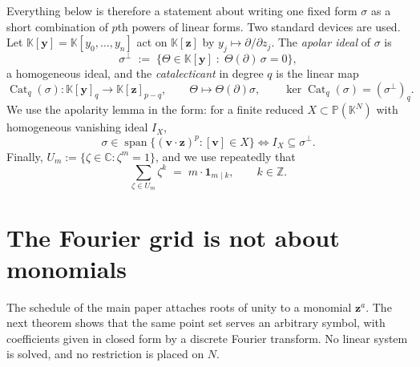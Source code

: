 \documentclass[final]{siamltex}
\DeclareMathOperator{\spanop}{span}
\DeclareMathOperator{\Cat}{Cat}
\newcommand{\C}{\mathbb{C}}
\newcommand{\Z}{\mathbb{Z}}
\newcommand{\K}{\mathbb{K}}
\newcommand{\by}{\bm{y}}
\newcommand{\bz}{\bm{z}}
\newcommand{\bv}{\bm{v}}
\begin{document}
Everything below is therefore a statement about writing one fixed form $\sigma$
as a short combination of $p$th powers of linear forms.  Two standard devices
are used.  Let $\K[\by] = \K[y_{0},\ldots,y_{n}]$ act on $\K[\bz]$ by
$y_{j} \mapsto \partial/\partial z_{j}$.  The \emph{apolar ideal} of $\sigma$ is
\begin{equation}\label{eq_apolar}
  \sigma^{\perp} \;:=\; \{\Theta \in \K[\by] \;:\; \Theta(\partial)\,\sigma = 0\},
\end{equation}
a homogeneous ideal, and the \emph{catalecticant} in degree $q$ is the linear map
\begin{equation}\label{eq_cat}
  \Cat_{q}(\sigma) \colon \K[\by]_{q} \to \K[\bz]_{p-q},
  \qquad
  \Theta \mapsto \Theta(\partial)\sigma,
  \qquad
  \ker \Cat_{q}(\sigma) = (\sigma^{\perp})_{q}.
\end{equation}
We use the apolarity lemma in the form: for a finite reduced
$X \subset \mathbb{P}(\K^{N})$ with homogeneous vanishing ideal $I_{X}$,
\begin{equation}\label{eq_apolarity}
  \sigma \in \spanop\{(\bv\cdot\bz)^{p} : [\bv] \in X\}
  \iff
  I_{X} \subseteq \sigma^{\perp}.
\end{equation}
Finally, $U_{m} := \{\zeta \in \C : \zeta^{m}=1\}$, and we use repeatedly that
\begin{equation}\label{eq_filter}
  \sum_{\zeta \in U_{m}} \zeta^{k} \;=\; m \cdot \mathbf{1}_{m \mid k},
  \qquad k \in \Z .
\end{equation}

\section{The Fourier grid is not about monomials}\label{sec_grid}

The schedule of the main paper attaches roots of unity to a monomial
$\bz^{a}$.  The next theorem shows that the same point set serves an arbitrary
symbol, with coefficients given in closed form by a discrete Fourier transform.
No linear system is solved, and no restriction is placed on $N$.
\end{document}
